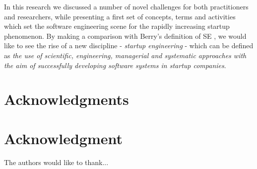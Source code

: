 \documentclass[10pt,journal,letterpaper,compsoc]{IEEEtran}
\begin{document}
In this research we discussed a number of novel challenges for both 
practitioners and researchers, while presenting a first set of concepts, terms 
and activities which set the software engineering scene for the rapidly 
increasing startup phenomenon. By making a comparison with Berry's definition of 
SE \cite{Berry1992}, we would like to see the rise of a new discipline - 
\textit{startup engineering} - which can be defined as  \textit{the use of 
scientific, engineering, managerial and systematic approaches with the aim of 
successfully developing software systems in startup companies}. %


%


\ifCLASSOPTIONcompsoc
  \section*{Acknowledgments}
\else
  \section*{Acknowledgment}
\fi


The authors would like to thank...
\end{document}
